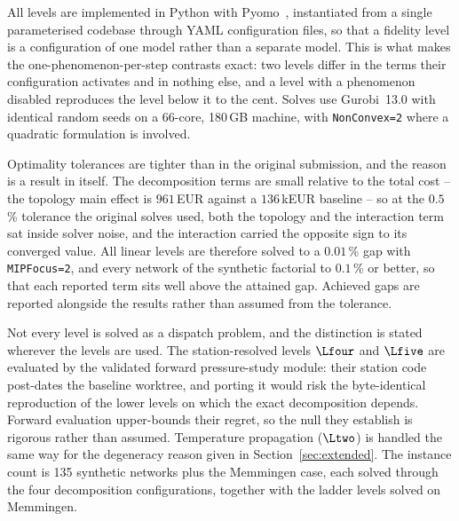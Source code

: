 
All levels are implemented in Python with Pyomo~\cite{pyomo}, instantiated from a single
parameterised codebase through YAML configuration files, so that a fidelity level is a
configuration of one model rather than a separate model. This is what makes the
one-phenomenon-per-step contrasts exact: two levels differ in the terms their configuration
activates and in nothing else, and a level with a phenomenon disabled reproduces the level
below it to the cent. Solves use Gurobi~13.0 with identical random seeds on a 66-core,
180\,GB machine, with \texttt{NonConvex=2} where a quadratic formulation is involved.

Optimality tolerances are tighter than in the original submission, and the reason is a
result in itself. The decomposition terms are small relative to the total cost -- the
topology main effect is $961$\,EUR against a $136$\,kEUR baseline -- so at the $0.5$\,\%
tolerance the original solves used, both the topology and the interaction term sat inside
solver noise, and the interaction carried the opposite sign to its converged value. All
linear levels are therefore solved to a $0.01$\,\% gap with \texttt{MIPFocus=2}, and every
network of the synthetic factorial to $0.1$\,\% or better, so that each reported term sits
well above the attained gap. Achieved gaps are reported alongside the results rather than
assumed from the tolerance.

Not every level is solved as a dispatch problem, and the distinction is stated wherever the
levels are used. The station-resolved levels $\Lfour$ and $\Lfive$ are evaluated by the
validated forward pressure-study module: their station code post-dates the baseline
worktree, and porting it would risk the byte-identical reproduction of the lower levels on
which the exact decomposition depends. Forward evaluation upper-bounds their regret, so the
null they establish is rigorous rather than assumed. Temperature propagation ($\Ltwo$) is
handled the same way for the degeneracy reason given in
Section~\ref{sec:extended}. The instance count is 135 synthetic networks plus the
Memmingen case, each solved through the four decomposition configurations, together with
the ladder levels solved on Memmingen.
